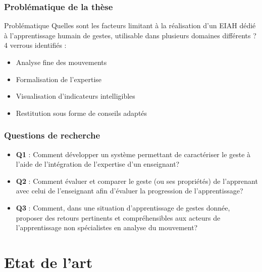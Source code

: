 \documentclass[svgnames]{beamer}
\newcommand{\mypart}[1]{\part{#1}\begin{frame}\tableofcontents\end{frame}}
\begin{document}
	\section{Problématique de la thèse}
	\begin{frame}{Problématique}
		Quelles sont les facteurs limitant à la réalisation d'un EIAH dédié à l'apprentissage humain de gestes, utilisable dans plusieurs domaines différents ?\\
		
		4 verrous identifiés :
		\begin{itemize}
			\item Analyse fine des mouvements
			\item Formalisation de l'expertise
			\item Visualisation d'indicateurs intelligibles
			\item Restitution sous forme de conseils adaptés
		\end{itemize}
	\end{frame}
	
	\section{Questions de recherche}
	\begin{frame}{\secname}
		\begin{itemize}[label=$-$]
			\item \textbf{Q1} : Comment développer un système permettant de caractériser le geste à l'aide de l'intégration de l'expertise d'un enseignant?
			\item \textbf{Q2} : Comment évaluer et comparer le geste (ou ses propriétés) de l'apprenant avec celui de l'enseignant afin d'évaluer la progression de l'apprentissage?
			\item \textbf{Q3} : Comment, dans une situation d'apprentissage de gestes donnée, proposer des retours pertinents et compréhensibles aux acteurs de l'apprentissage non spécialistes en analyse du mouvement?
		\end{itemize}
	\end{frame}

	
	
	\mypart{Etat de l'art}
\end{document}
